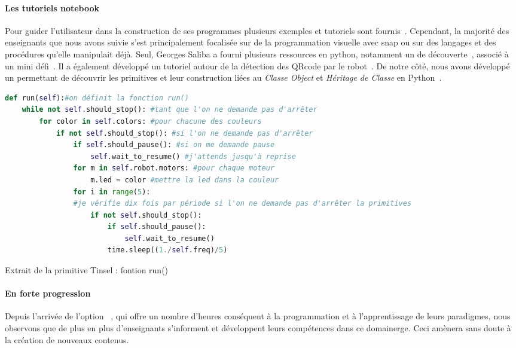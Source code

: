             \paragraph{Les tutoriels notebook}
                Pour guider l'utilisateur dans la construction de ses programmes plusieurs exemples et tutoriels sont fournis~. Cependant, la majorité des enseignants que nous avons suivie s'est principalement focalisée sur de la programmation visuelle avec \glsdesc{snap} ou sur des langages et des procédures qu'elle manipulait déjà. Seul, Georges Saliba a fourni plusieurs ressources en python, notamment un  de découverte~, associé à un mini défi~. Il a également développé un tutoriel autour de la détection des QRcode par le robot~. De notre côté, nous avons développé un  permettant de découvrir les primitives et leur construction liées au \textit{Classe Object} et \textit{Héritage de Classe} en Python~.
\begin{code}
\begin{lstlisting}[language=Python,basicstyle=\footnotesize]
def run(self):#on définit la fonction run()
    while not self.should_stop(): #tant que l'on ne demande pas d'arrêter
        for color in self.colors: #pour chacune des couleurs
            if not self.should_stop(): #si l'on ne demande pas d'arrêter
                if self.should_pause(): #si on me demande pause
                    self.wait_to_resume() #j'attends jusqu'à reprise
                for m in self.robot.motors: #pour chaque moteur
                    m.led = color #mettre la led dans la couleur
                for i in range(5):
                #je vérifie dix fois par période si l'on ne demande pas d'arrêter la primitives
                    if not self.should_stop():
                        if self.should_pause(): 
                            self.wait_to_resume()
                        time.sleep((1./self.freq)/5)
\end{lstlisting}
\caption[Exemple de Primitives (Tinsel, pyhon)]{\label{cod:tinsel}Extrait de la primitive Tinsel : fontion run()}
\end{code}\par%
            \paragraph{En forte progression}
                Depuis l'arrivée de l'option ~, qui offre un nombre d'heures conséquent à la programmation et à l'apprentissage de leurs paradigmes, nous observons que de plus en plus d'enseignants s'informent et développent leurs compétences dans ce domainerge. Ceci amènera sans doute à la création de nouveaux contenus.
